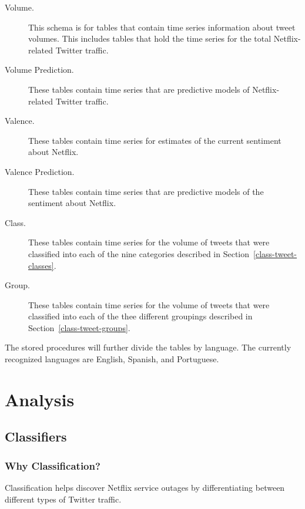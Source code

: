 \documentclass[12pt]{ucthesis}
\begin{document}
\begin{description}
   \item[Volume.]
   This schema is for tables that contain time series information about tweet volumes.
   This includes tables that hold the time series for the total Netflix-related Twitter traffic.

   \item[Volume Prediction.]
   These tables contain time series that are predictive models of Netflix-related Twitter traffic.

   \item[Valence.]
   These tables contain time series for estimates of the current sentiment about Netflix.

   \item[Valence Prediction.]
   These tables contain time series that are predictive models of the sentiment about Netflix.

   \item[Class.]
   These tables contain time series for the volume of tweets that were classified into
   each of the nine categories described in Section~\ref{class-tweet-classes}.

   \item[Group.]
   These tables contain time series for the volume of tweets that were classified into
   each of the thee different groupings described in Section~\ref{class-tweet-groups}.
\end{description}

The stored procedures will further divide the tables by language. The currently recognized languages are English,
Spanish, and Portuguese.

\part{Analysis}
\label{analysis}

\chapter{Classifiers}
\label{classifiers}

\section{Why Classification?}
\label{class-why}
Classification helps discover Netflix service outages by differentiating between different types of Twitter traffic.
\end{document}
